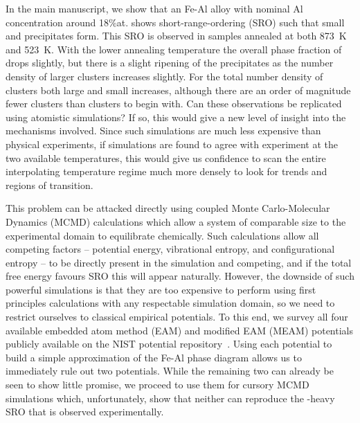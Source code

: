 In the main manuscript, we show that an Fe-Al alloy with nominal Al concentration around 18\%at. shows short-range-ordering (SRO) such that small \DOTHREE and \BTWO precipitates form.
This SRO is observed in samples annealed at both 873~K and 523~K.
With the lower annealing temperature the overall phase fraction of \DOTHREE drops slightly, but there is a slight ripening of the precipitates as the number density of larger clusters increases slightly.
For \BTWO the total number density of clusters both large and small increases, although there are an order of magnitude fewer \BTWO clusters than \DOTHREE clusters to begin with.
Can these observations be replicated using atomistic simulations?
If so, this would give a new level of insight into the mechanisms involved.
Since such simulations are much less expensive than physical experiments, if simulations are found to agree with experiment at the two available temperatures, this would give us confidence to scan the entire interpolating temperature regime much more densely to look for trends and regions of transition.

This problem can be attacked directly using coupled Monte Carlo-Molecular Dynamics (MCMD) calculations which allow a system of comparable size to the experimental domain to equilibrate chemically.
Such calculations allow all competing factors -- potential energy, vibrational entropy, and configurational entropy -- to be directly present in the simulation and competing, and if the total free energy favours SRO this will appear naturally.
However, the downside of such powerful simulations is that they are too expensive to perform using first principles calculations with any respectable simulation domain, so we need to restrict ourselves to classical empirical potentials.
To this end, we survey all four available embedded atom method (EAM) and modified EAM (MEAM) potentials publicly available on the NIST potential repository~\cite{nist}.
Using each potential to build a simple approximation of the Fe-Al phase diagram allows us to immediately rule out two potentials.
While the remaining two can already be seen to show little promise, we proceed to use them for cursory MCMD simulations which, unfortunately, show that neither can reproduce the \DOTHREE-heavy SRO that is observed experimentally.